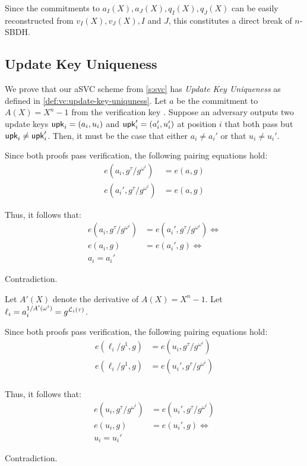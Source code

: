 Since the commitments to $a_I(X),a_J(X),q_I(X),q_J(X)$ can be easily reconstructed from $v_I(X),v_J(X), I$ and $J$, this constitutes a direct break of $n$-SBDH.

\subsection{Update Key Uniqueness}
\label{s:update-key-uniqueness-proof}

We prove that our aSVC scheme from \cref{s:svc} has \textit{Update Key Uniqueness} as defined in \cref{def:vc:update-key-uniquness}.
Let $a$ be the commitment to $A(X)=X^n - 1$ from the verification key \vrk.
Suppose an adversary outputs two update keys $\mathsf{upk}_i = (a_i, u_i)$ and $\mathsf{upk}_i'=(a_i',u_i')$ at position $i$ that both pass \vcverifyupk but $\mathsf{upk}_i\ne \mathsf{upk}_i'$.
Then, it must be the case that either $a_i \ne a_i'$ or that $u_i \ne u_i'$.

Since both proofs pass verification, the following pairing equations hold:
\begin{align}
e(a_i, g^\tau / g^{\omega^i}) &= e(a, g)\\
e(a_i', g^\tau / g^{\omega^i}) &= e(a, g)
\end{align}

Thus, it follows that:
\begin{align}
e(a_i, g^\tau / g^{\omega^i}) &= e(a_i', g^\tau / g^{\omega^i})\Leftrightarrow\\
e(a_i, g) &= e(a_i', g)\Leftrightarrow\\
a_i = a_i'
\end{align}

Contradiction.

Let $A'(X)$ denote the derivative of $A(X)=X^n - 1$.
Let $\ell_i=a_i^{1/A'(\omega^i)}=g^{\mathcal{L}_i(\tau)}$.

Since both proofs pass verification, the following pairing equations hold:
\begin{align}
e(\ell_i/g^1, g) &= e(u_i,g^\tau/g^{\omega^i})\\
e(\ell_i/g^1, g) &= e(u_i',g^\tau/g^{\omega^i})\\
\end{align}

Thus, it follows that:
\begin{align}
e(u_i,g^\tau/g^{\omega^i}) &= e(u_i',g^\tau/g^{\omega^i})\\
e(u_i, g) &= e(u_i', g)\Leftrightarrow\\
u_i = u_i'
\end{align}

Contradiction.